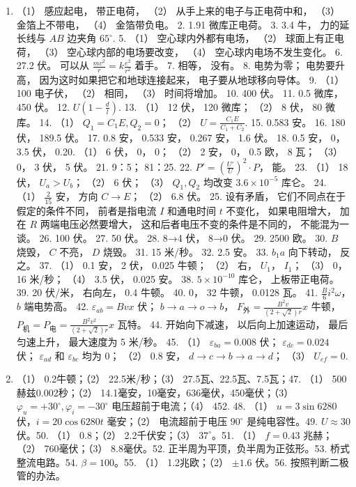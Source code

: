 \begin{enumerate}
\def\labelenumi{\arabic{enumi}.}
\item
  （1） 感应起电， 带正电荷， （2） 从手上来的电子与正电荷中和， （3）
  金箔上不带电， （4） 金箔带负电。 2. 1.91 微库正电荷。 3. 3.4 牛，
  力的延长线与 \(AB\) 边夹角 \(65^{\circ}\). 5. （1）
  空心球内外都有电场， （2） 球面上有正电荷， （3）
  空心球内部的电场要改变， （4） 空心球内电场不发生变化。 6. 27.2 伏。
  可以从 \(\frac{mv^2}{r} = k \frac{e^2}{r^2}\) 着手。 7. 相等， 没有。
  8. 电势为零； 电势要升高， 因为这时如果把它和地球连接起来，
  电子要从地球移向导体。 9. （1） 100 电子伏， （2） 相同， （3）
  时间将增加。 10. 400 伏。 11. 0.5 微库， 450 伏。 12.
  \(U\left(1 - \frac{d}{l}\right)\). 13. （1） 12 伏， 120 微库； （2）
  8 伏， 80 微库。 14. （1） \(Q_{1} = C_{1}E, Q_{2} = 0\)； （2）
  \(U = \frac{C_{1}E}{C_{1} + C_{2}}\). 15. 0.583 安。 16. 180 伏，
  189.5 伏。 17. 0.8 安， 0.533 安， 0.267 安， 1.6 伏。 18. 0.5 安，
  0， 3.5 伏， 0.20. （1） 6 伏， 0， 0； （2） 2 安， 0， 0.5 欧， 8
  瓦； （3） 0， 3 伏， 5 伏。 21. 9：5； 81：25. 22.
  \(P' = \left(\frac{U'}{U}\right)^2 \cdot P\)， 能。 23. （1） 18 伏，
  \(U_a > U_b\)； （2） 6 伏； （3） \(Q_1, Q_2\) 均改变
  \(3.6 \times 10^{-5}\) 库仑。 24. （1） \(\frac{2}{15}\) 安， 方向
  \(C \to E\)； （2） 6.8 伏。 25. 设有矛盾，
  它们不同点在于假定的条件不同， 前者是指电流 \(I\) 和通电时间 \(t\)
  不变化， 如果电阻增大， 加在 \(R\) 两端电压必然要增大，
  这和后者电压不变的条件是不同的， 不能混为一谈。 26. 100 伏。 27. 50
  伏。 28. 8→4 伏， 8→0 伏。 29. 2500 欧。 30. \(B\) 烧毁， \(C\) 不亮，
  \(D\) 烧毁。 31. 15 米/秒。 32. 2.5 安。 33. \(b_{1}a\) 向下转动，
  反之。 37. （1） 0.1 安， 2 伏， 0.025 牛顿； （2） 右， \(U_{1}\)，
  \(I_{1}\)； （3） 0， 16 米/秒； （4） 3.5 伏， 0.025 安。 38.
  \(5 \times 10^{-10}\) 库仑， 上板带正电荷。 39. 20 伏/米， 右向左，
  0.4 牛顿。 40. 0， 32 牛顿， 0.0128 瓦。 41.
  \(\frac{B}{6} i^{2}\omega\)， \(b\) 端电势高。 42.
  \(\varepsilon_{ab} = Bvx\) 伏； \(b \to a \to o \to b\)，
  \(F_{\text{外}} = \frac{B^{2}v}{(2 + \sqrt{2})r} x\) 牛顿，
  \(P_{\text{机}} = P_{\text{电}} = \frac{B^{2}v^{2}}{(2 + \sqrt{2})r} x\)
  瓦特。 44. 开始向下减速， 以后向上加速运动， 最后匀速上升， 最大速度为
  5 米/秒。 45. （1） \(\varepsilon_{ba} = 0.008\) 伏；
  \(\varepsilon_{dc} = 0.024\) 伏； \(\varepsilon_{ad}\) 和
  \(\varepsilon_{bc}\) 均为 0； （2） 0.8 安，
  \(d \to c \to b \to a \to d\)； （3） \(U_{ef} = 0\).
\item
  （1） 0.2牛顿；（2） 22.5米/秒；（3） 27.5瓦、22.5瓦、7.5瓦；47. （1）
  500赫兹0.002秒；（2） 14.1毫安，10毫安，636毫伏，450毫伏；（3）
  \(\varphi_{u} = +30^{\circ}, \varphi_{i} = -30^{\circ}\)
  电压超前于电流；（4） 452. 48. （1） \(u = 3\sin 6280\)
  伏，\(i = 20\cos 6280t\) 毫安；（2） 电流超前于电压 \(90^{\circ}\)
  是纯电容性。49. \(U \approx 30\) 伏。50. （1） 0.8；（2）
  2.2千伏安；（3） \(37^{\circ}\)。51. （1） \(f = 0.43\) 兆赫；（2）
  760毫伏；（3） 8.8毫伏。52. 正半周为平顶，负半周为正弦形。53.
  桥式整流电路。54. \(\beta = 100\)。55. （1） 1.2兆欧；（2）
  \(\pm 1.6\) 伏。56. 按照判断二极管的办法。
\end{enumerate}

